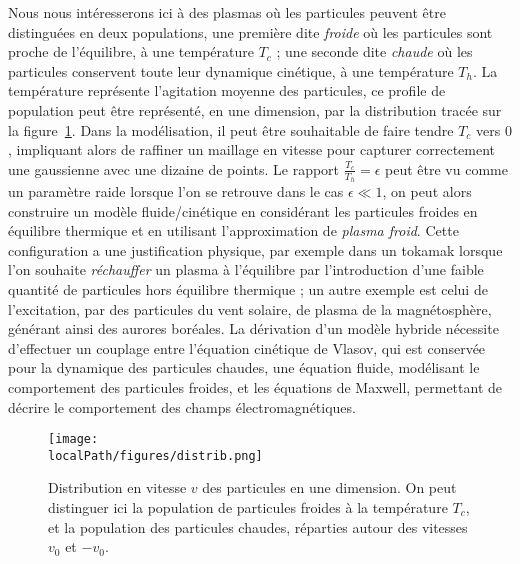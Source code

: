 Nous nous intéresserons ici à des plasmas où les particules peuvent être distinguées en deux populations, une première dite \emph{froide} où les particules sont proche de l'équilibre, à une température $T_c$ ; une seconde dite \emph{chaude} où les particules conservent toute leur dynamique cinétique, à une température $T_h$. La température représente l'agitation moyenne des particules, ce profile de population peut être représenté, en une dimension, par la distribution tracée sur la figure~\ref{fig:intro:distrib}. Dans la modélisation, il peut être souhaitable de faire tendre $T_c$ vers $0$, impliquant alors de raffiner un maillage en vitesse pour capturer correctement une gaussienne avec une dizaine de points. Le rapport $\frac{T_c}{T_h}=\epsilon$ peut être vu comme un paramètre raide lorsque l'on se retrouve dans le cas $\epsilon \ll 1$, on peut alors construire un modèle fluide/cinétique en considérant les particules froides en équilibre thermique et en utilisant l'approximation de \emph{plasma froid}. Cette configuration a une justification physique, par exemple dans un tokamak lorsque l'on souhaite \emph{réchauffer} un plasma à l'équilibre par l'introduction d'une faible quantité de particules hors équilibre thermique ; un autre exemple est celui de l’excitation, par des particules du vent solaire, de plasma de la magnétosphère, générant ainsi des aurores boréales. La dérivation d'un modèle hybride nécessite d'effectuer un couplage entre l'équation cinétique de Vlasov, qui est conservée pour la dynamique des particules chaudes, une équation fluide, modélisant le comportement des particules froides, et les équations de Maxwell, permettant de décrire le comportement des champs électromagnétiques. 

\begin{figure}[h]
  \centering
  \texttt{[image: \\localPath/figures/distrib.png]}
  \caption{Distribution en vitesse $v$ des particules en une dimension. On peut distinguer ici la population de particules froides à la température $T_c$, et la population des particules chaudes, réparties autour des vitesses $v_0$ et $-v_0$.}
  \label{fig:intro:distrib}
\end{figure}
